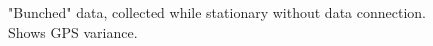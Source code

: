 ﻿\documentclass{article}
\begin{document}
\begin{figure}[H]
    \centering
    \begin{center}
    \end{center}
    \caption{"Bunched" data, collected while stationary without data connection. Shows GPS variance.}
    \label{fig:my_label}
\end{figure}
\end{document}
